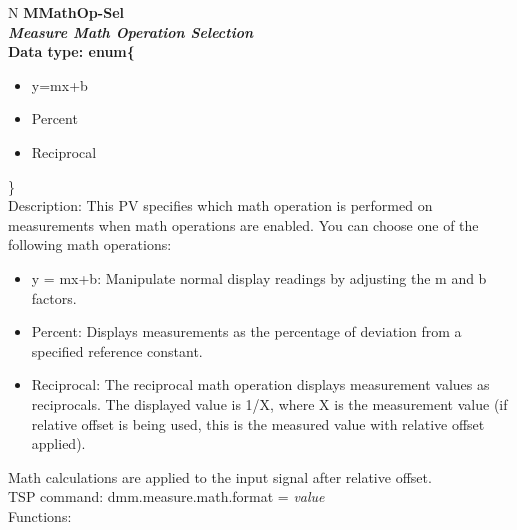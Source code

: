 \documentclass[openany]{article}
\begin{document}
		\begin{tabular}{N}
			\hline
			\bfseries MMathOp-Sel\label{pv:mmathop-sel} \\ \hline
			\emph{Measure Math Operation Selection} \\
			Data type: enum\{\begin{itemize}[noitemsep]
				\small
				\item[] y=mx+b
				\item[] Percent
				\item[] Reciprocal
			\end{itemize}\} \\
			Description: This PV specifies which math operation is performed on measurements when math operations are enabled. You can choose one of the following math operations: \begin{itemize} \item y = mx+b: Manipulate normal display readings by adjusting the m and b factors. \item Percent: Displays measurements as the percentage of deviation from a specified reference constant. \item Reciprocal: The reciprocal math operation displays measurement values as reciprocals. The displayed value is 1/X, where X is the measurement value (if relative offset is being used, this is the measured value with relative offset applied). \end{itemize} Math calculations are applied to the input signal after relative offset.\\
			TSP command: dmm.measure.math.format = \emph{value} \\
			Functions: \\
			\arrayrulecolor{\FuncTableBorderColor}

		\end{tabular}
\end{document}
